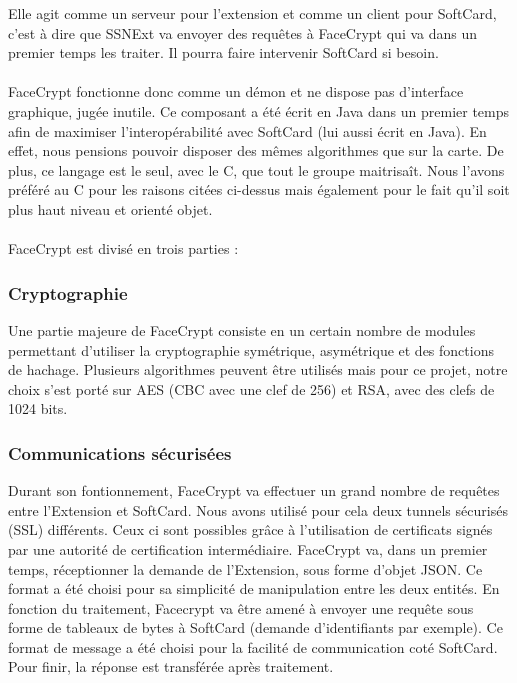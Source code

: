 \documentclass[a4paper,11pt,french]{article}
\begin{document}
Elle agit comme un serveur pour l'extension et comme un client pour SoftCard, 
c'est à dire que SSNExt va envoyer des requêtes à FaceCrypt qui va dans un 
premier temps les traiter. Il pourra faire intervenir SoftCard si besoin.

\paragraph{}
FaceCrypt fonctionne donc comme un démon et ne dispose pas d'interface
graphique, jugée inutile. Ce composant a été écrit en Java dans un premier 
temps afin de maximiser l'interopérabilité avec SoftCard (lui aussi écrit en 
Java). En effet, nous pensions pouvoir disposer des mêmes algorithmes 
que sur la carte. De plus, ce langage est le seul, avec le C, que tout le
groupe maitrisaît. Nous l'avons préféré au C pour les raisons citées ci-dessus
mais également pour le fait qu'il soit plus haut niveau et orienté objet.

\paragraph{}
FaceCrypt est divisé en trois parties : 

\subsubsection{Cryptographie}
Une partie majeure de FaceCrypt consiste en un certain nombre de modules 
permettant d'utiliser la cryptographie symétrique, asymétrique et des 
fonctions de hachage. Plusieurs algorithmes peuvent être utilisés mais
pour ce projet, notre choix s'est porté sur AES (CBC avec une clef de 256) et 
RSA, avec des clefs de 1024 bits.

\subsubsection{Communications sécurisées}
Durant son fontionnement, FaceCrypt va effectuer un grand nombre de requêtes
entre l'Extension et SoftCard. Nous avons utilisé pour cela deux tunnels
sécurisés (SSL) différents. Ceux ci sont possibles grâce à l'utilisation de
certificats signés par une autorité de certification intermédiaire. FaceCrypt
va, dans un premier temps, réceptionner la demande de l'Extension, sous forme
d'objet JSON. Ce format a été choisi pour sa simplicité de manipulation entre
les deux entités. En fonction du traitement, Facecrypt va être amené à envoyer
une requête sous forme de tableaux de bytes à SoftCard (demande d'identifiants
par exemple). Ce format de message a été choisi pour la facilité de 
communication coté SoftCard. Pour finir, la réponse est transférée après
traitement.
\end{document}
